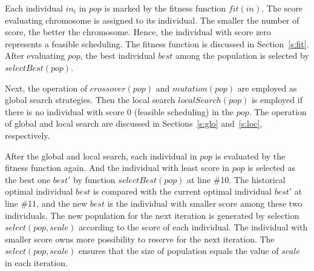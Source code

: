 \documentclass[journal]{IEEEtran}
\theoremstyle{remark}
\begin{document}
Each individual $in_i$ in $pop$ is marked by the fitness function $fit(in)$. 
The score evaluating chromosome is assigned to its individual.
The smaller the number of score, the better the chromosome.
Hence,
 the individual with score zero represents a feasible scheduling.
The fitness function is discussed in Section~\ref{s:fit}.
After evaluating $pop$, the best individual $best$ among the population is selected by $selectBest(pop)$.

Next, the operation of $crossover(pop)$ and $mutation(pop)$ are employed as global search strategies.
Then the local search $localSearch(pop)$ is employed if there is no individual with score 0 (feasible scheduling) in the $pop$.
The operation of global and local search are discussed in Sections~\ref{s:glo} and~\ref{s:loc}, respectively.

After the global and local search,
 each individual in $pop$ is evaluated by the fitness function again.
And the individual with least score in $pop$ is selected as the best one $best'$ by function $selectBest(pop)$ at line \#10.
The historical optimal individual $best$ is compared with the current optimal individual $best'$ at line \#11,
 and the new $best$ is the individual with smaller score among these two individuals.
The new population for the next iteration is generated by selection $select(pop,scale)$ according to the score of each individual.
The individual with smaller score owns more possibility to reserve for the next iteration.
The $select(pop,scale)$ ensures that the size of population equals the value of $scale$ in each iteration.
\end{document}
